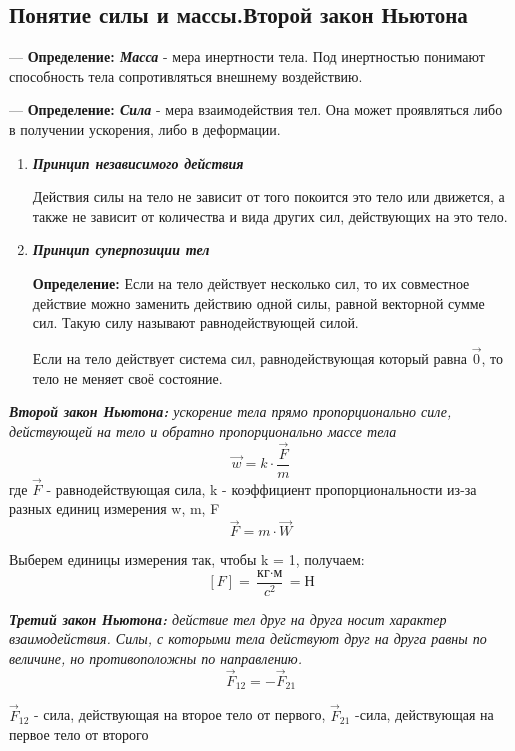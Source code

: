 \documentclass[12pt,a4paper]{report}
\begin{document}
\subsection{Понятие силы и массы.Второй закон Ньютона}

--- \textbf{Определение: \textit{Масса}} - мера инертности тела. Под инертностью понимают способность тела сопротивляться внешнему воздействию.

\vspace{5px}

--- \textbf{Определение: \textit{Сила}} - мера взаимодействия тел. Она может проявляться либо в получении ускорения, либо в деформации.

\begin{enumerate}
    \item \textbf{\textit{Принцип независимого действия }}

          Действия силы на тело не зависит от того покоится это тело или движется, а также не зависит от количества и вида других сил, действующих на это тело.
          \newpage
    \item \textbf{\textit{Принцип суперпозиции тел}}

          \textbf{Определение:} Если на тело действует несколько сил, то их совместное действие можно заменить действию одной силы, равной векторной сумме сил. Такую силу называют равнодействующей силой.

          Если на тело действует система сил, равнодействующая который равна $\vec 0$, то тело не меняет своё состояние.
\end{enumerate}
\textit{\textbf{Второй закон Ньютона:} ускорение тела прямо пропорционально силе, действующей на тело и обратно пропорционально массе тела} \[ \vec w = k \cdot \frac{\vec F}{m} \] где $\vec F$ - равнодействующая сила, k - коэффициент пропорциональности из-за разных единиц измерения w, m, F
\[ \vec F = m \cdot \vec W\]

Выберем единицы измерения так, чтобы k = 1, получаем:
\[[F] = \frac{\text{кг}\cdot\text{м}}{c^2} = \text{Н}\]

\textit{\textbf{Третий закон Ньютона:} действие тел друг на друга носит характер взаимодействия. Силы, с которыми тела действуют друг на друга равны по величине, но противоположны по направлению.}
\[\vec F_{12} = - \vec F_{21}\]

$\vec F_{12}$ - сила, действующая на второе тело от первого, $\vec F_{21}$ -сила, действующая на первое тело от второго
\end{document}
